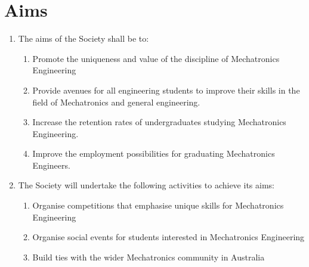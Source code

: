 \documentclass[11pt]{article}
\begin{document}
\section{Aims}
\begin{enumerate}[\thesection .1]
    \item The aims of the Society shall be to:
    \begin{enumerate}
        \item Promote the uniqueness and value of the discipline of Mechatronics Engineering
        \item Provide avenues for all engineering students to improve their skills in the field of Mechatronics and general engineering.
        \item Increase the retention rates of undergraduates studying Mechatronics Engineering.
        \item Improve the employment possibilities for graduating Mechatronics Engineers.
    \end{enumerate}
    \item The Society will undertake the following activities to achieve its aims:
    \begin{enumerate}
        \item Organise competitions that emphasise unique skills for Mechatronics Engineering
        \item Organise social events for students interested in Mechatronics Engineering
        \item Build ties with the wider Mechatronics community in Australia
    \end{enumerate}
\end{enumerate}
\end{document}
